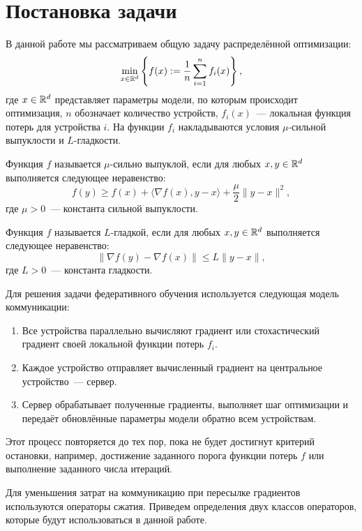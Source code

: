 \section{Постановка задачи}

    В данной работе мы рассматриваем общую задачу распределённой оптимизации:
    \begin{equation}
        \min \limits_{x \in \mathbb{R}^d}  \left\{f(x) := \frac{1}{n} \sum \limits_{i=1}^n f_i(x) \right\}, \label{eq:problem_statement}
    \end{equation}
    где $x \in \mathbb{R}^d$ представляет параметры модели, по которым происходит оптимизация, $n$ обозначает количество устройств, $f_i(x)$~--- локальная функция потерь для устройства $i$. На функции $f_i$ накладываются условия $\mu$-сильной выпуклости и $L$-гладкости.

    \begin{definition}
        Функция $f$ называется $\mu$-сильно выпуклой, если для любых $x, y \in \mathbb{R}^d$ выполняется следующее неравенство:
        \begin{equation}
            f(y) \geq f(x) + \langle \nabla f(x), y - x \rangle + \frac{\mu}{2} \|y - x\|^2, \label{eq:strong_convexity}
        \end{equation}
        где $\mu > 0$~--- константа сильной выпуклости.
    \end{definition}

    \begin{definition}
        Функция $f$ называется $L$-гладкой, если для любых $x, y \in \mathbb{R}^d$ выполняется следующее неравенство:
        \begin{equation}
            \|\nabla f(y) - \nabla f(x)\| \leq L \|y - x\|, \label{eq:smoothness}
        \end{equation}
        где $L > 0$~--- константа гладкости.
    \end{definition}


    Для решения задачи федеративного обучения используется следующая модель коммуникации:

    \begin{enumerate}
        \item Все устройства параллельно вычисляют градиент или стохастический градиент своей локальной функции потерь $f_i$.
        \item Каждое устройство отправляет вычисленный градиент на центральное устройство~--- сервер.
        \item Сервер обрабатывает полученные градиенты, выполняет шаг оптимизации и передаёт обновлённые параметры модели обратно всем устройствам.
    \end{enumerate}

    Этот процесс повторяется до тех пор, пока не будет достигнут критерий остановки, например, достижение заданного порога функции потерь $f$ или выполнение заданного числа итераций.

    Для уменьшения затрат на коммуникацию при пересылке градиентов используются операторы сжатия. Приведем определения двух классов операторов, которые будут использоваться в данной работе.

    